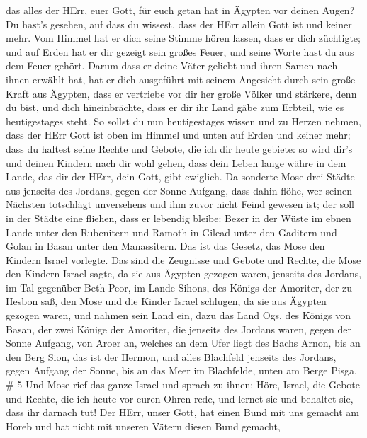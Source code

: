 das alles der HErr, euer Gott, für euch getan hat in Ägypten vor deinen
Augen?  Du hast's gesehen, auf dass du wissest, dass der
HErr allein Gott ist und keiner mehr.  Vom Himmel hat er
dich seine Stimme hören lassen, dass er dich züchtigte; und auf Erden
hat er dir gezeigt sein großes Feuer, und seine Worte hast du aus dem
Feuer gehört.  Darum dass er deine Väter geliebt und ihren
Samen nach ihnen erwählt hat, hat er dich ausgeführt mit seinem
Angesicht durch sein große Kraft aus Ägypten,  dass er
vertriebe vor dir her große Völker und stärkere, denn du bist, und dich
hineinbrächte, dass er dir ihr Land gäbe zum Erbteil, wie es
heutigestages steht.  So sollst du nun heutigestages wissen
und zu Herzen nehmen, dass der HErr Gott ist oben im Himmel und unten
auf Erden und keiner mehr;  dass du haltest seine Rechte
und Gebote, die ich dir heute gebiete: so wird dir's und deinen Kindern
nach dir wohl gehen, dass dein Leben lange währe in dem Lande, das dir
der HErr, dein Gott, gibt ewiglich.  Da sonderte Mose drei
Städte aus jenseits des Jordans, gegen der Sonne Aufgang, 
dass dahin flöhe, wer seinen Nächsten totschlägt unversehens und ihm
zuvor nicht Feind gewesen ist; der soll in der Städte eine fliehen, dass
er lebendig bleibe:  Bezer in der Wüste im ebnen Lande
unter den Rubenitern und Ramoth in Gilead unter den Gaditern und Golan
in Basan unter den Manassitern.  Das ist das Gesetz, das
Mose den Kindern Israel vorlegte.  Das sind die Zeugnisse
und Gebote und Rechte, die Mose den Kindern Israel sagte, da sie aus
Ägypten gezogen waren,  jenseits des Jordans, im Tal
gegenüber Beth-Peor, im Lande Sihons, des Königs der Amoriter, der zu
Hesbon saß, den Mose und die Kinder Israel schlugen, da sie aus Ägypten
gezogen waren,  und nahmen sein Land ein, dazu das Land
Ogs, des Königs von Basan, der zwei Könige der Amoriter, die jenseits
des Jordans waren, gegen der Sonne Aufgang,  von Aroer an,
welches an dem Ufer liegt des Bachs Arnon, bis an den Berg Sion, das ist
der Hermon,  und alles Blachfeld jenseits des Jordans,
gegen Aufgang der Sonne, bis an das Meer im Blachfelde, unten am Berge
Pisga. \# 5  Und Mose rief das ganze Israel und sprach zu
ihnen: Höre, Israel, die Gebote und Rechte, die ich heute vor euren
Ohren rede, und lernet sie und behaltet sie, dass ihr darnach tut!
 Der HErr, unser Gott, hat einen Bund mit uns gemacht am
Horeb  und hat nicht mit unseren Vätern diesen Bund gemacht,
